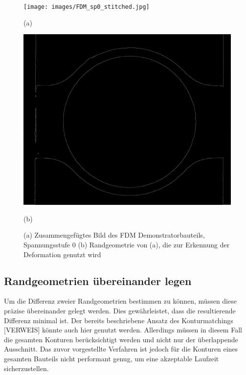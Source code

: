 \begin{figure}[H]
    \centering
    \begin{minipage}{0.49\textwidth}
        \centering
        \texttt{[image: images/FDM\_sp0\_stitched.jpg]} %
        \caption*{(a)} 
    \end{minipage}\hfill
    \begin{minipage}{0.49\textwidth}
        \centering
        \includegraphics[width=\textwidth]{images/contours_FDM_sp0_stitched.jpg} %
        \caption*{(b)}
    \end{minipage}\hfill
    \caption{(a) Zusammengefügtes Bild des FDM Demonstratorbauteils, Spannungsstufe 0
    (b) Randgeometrie von (a), die zur Erkennung der Deformation genutzt wird}
        \label{fig:stichted_contour}
\end{figure}

\subsection{Randgeometrien übereinander legen}

Um die Differenz zweier Randgeometrien bestimmen zu können, 
müssen diese präzise übereinander gelegt werden. Dies gewährleistet, 
dass die resultierende Differenz minimal ist. Der bereits beschriebene Ansatz 
des Konturmatchings [VERWEIS] könnte auch hier genutzt werden. Allerdings 
müssen in diesem Fall die gesamten Konturen berücksichtigt werden und nicht 
nur der überlappende Ausschnitt. Das zuvor vorgestellte Verfahren ist jedoch 
für die Konturen eines gesamten Bauteils nicht performant genug, um eine 
akzeptable Laufzeit sicherzustellen.

